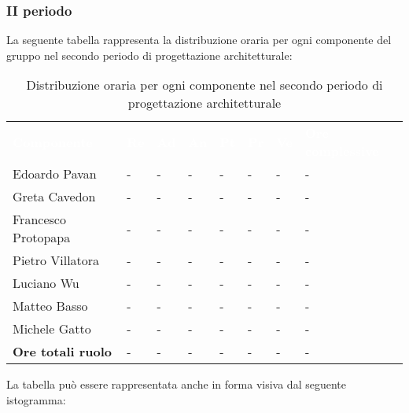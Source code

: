 \subsubsection{II periodo}
La seguente tabella rappresenta la distribuzione oraria per ogni componente del gruppo nel secondo periodo di progettazione architetturale:
\begin{table}[!htbp]
\begin{center}
\renewcommand{\arraystretch}{1.25}
\begin{tabular}{ m{}<{\centering}  m{}<{\centering} m{}<{\centering} m{}<{\centering}  m{}<{\centering}  m{}<{\centering}  m{}<{\centering}  m{}<{\centering}   }
	\rowcolor{darkblue}
	\textcolor{white}{\textbf{Componente}} &\textcolor{white}{\textbf{Re}}&\textcolor{white}{\textbf{Ad}}&\textcolor{white}{\textbf{An}}&\textcolor{white}{\textbf{Pt}}&\textcolor{white}{\textbf{Pr}}&\textcolor{white}{\textbf{Ve}}&\textcolor{white}{\textbf{Ore complessive}}\\ 

	Edoardo Pavan & - & - & - & - & - & - & -\\	

	Greta Cavedon & - & - & - & - & - & - & -\\
	
	Francesco Protopapa & - & - & - & - & - & - & -\\
	
	Pietro Villatora & - & - & - & - & - & - & -\\
	
	Luciano Wu & - & - & - & - & - & - & -\\
	
	Matteo Basso & - & - & - & - & - & - & -\\
	
	Michele Gatto & - & - & - & - & - & - & -\\
	
	\textbf{Ore totali ruolo} & - & - & - & - & - & - & -\\

\end{tabular}
\caption{Distribuzione oraria per ogni componente nel secondo periodo di progettazione architetturale}
\end{center}
\end{table}

La tabella può essere rappresentata anche in forma visiva dal seguente istogramma:

